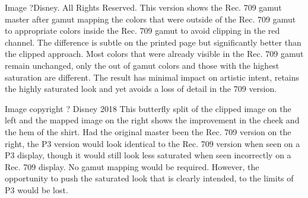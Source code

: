 Image ?Disney. All Rights Reserved.
This version shows the Rec. 709 gamut master after gamut mapping the colors that were outside of the Rec. 709 gamut to appropriate colors inside the Rec. 709 gamut to avoid clipping in the red channel. The difference is subtle on the printed page but significantly better than the clipped approach. Most colors that were already visible in the Rec. 709 gamut remain unchanged, only the out of gamut colors and those with the highest saturation are different. The result has minimal impact on artistic intent, retains the highly saturated look and yet avoids a loss of detail in the 709 version.


Image copyright ? Disney 2018
This butterfly split of the clipped image on the left and the mapped image on the right shows the improvement in the cheek and the hem of the shirt. Had the original master been the Rec. 709 version on the right, the P3 version would look identical to the Rec. 709 version when seen on a P3 display, though it would still look less saturated when seen incorrectly on a Rec. 709 display. No gamut mapping would be required. However, the opportunity to push the saturated look that is clearly intended, to the limits of P3 would be lost.

